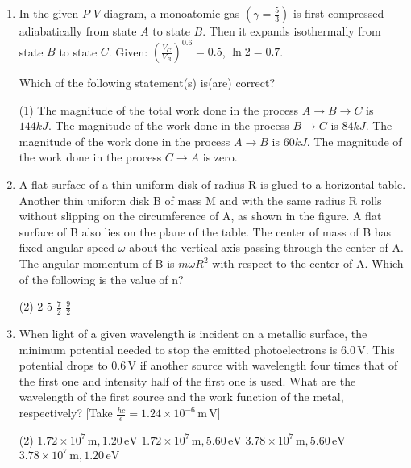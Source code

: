 \documentclass{article}
\begin{document}
\begin{enumerate}
    \item In the given \(P\)-\(V\) diagram, a monoatomic gas \( \left( \gamma = \frac{5}{3} \right) \) is first compressed adiabatically from state \(A\) to state \(B\). Then it expands isothermally from state \(B\) to state \(C\). Given: \( \left(\frac{V_C}{V_B}\right)^{0.6} = 0.5 \), \( \ln 2 = 0.7 \). 
    \begin{center}
        \end{center}Which of the following statement(s) is(are) correct?
        \begin{tasks}(1)
            \task The magnitude of the total work done in the process \( A \rightarrow B \rightarrow C \) is \( 144 kJ \).
            \task The magnitude of the work done in the process \( B \rightarrow C \) is \( 84 kJ \).
            \task The magnitude of the work done in the process \( A \rightarrow B \) is \( 60 kJ \).
            \task The magnitude of the work done in the process \( C \rightarrow A \) is zero.
        \end{tasks}

    \item A flat surface of a thin uniform disk of radius R is glued to a horizontal table. Another thin uniform disk B of mass M and with the same radius R rolls without slipping on the circumference of A, as shown in the figure. A flat surface of B also lies on the plane of the table. The center of mass of B has fixed angular speed \(\omega\) about the vertical axis passing through the center of A. The angular momentum of B is \(m\omega R^2\) with respect to the center of A. Which of the following is the value of n?
        \begin{center}
        \end{center}
        \begin{tasks}(2)
        	\task \(2\)
        	\task \(5\)
        	\task \(\frac{7}{2}\)
        	\task \(\frac{9}{2}\)
        \end{tasks}
    \item When light of a given wavelength is incident on a metallic surface, the minimum potential needed to stop the emitted photoelectrons is \(6.0 \, \text{V}\). This potential drops to \(0.6 \, \text{V}\) if another source with wavelength four times that of the first one and intensity half of the first one is used. What are the wavelength of the first source and the work function of the metal, respectively? [Take \(\frac{hc}{e} = 1.24 \times 10^{-6} \, \text{m} \, \text{V}\)]
        \begin{tasks}(2)
        	\task \(1.72 \times 10^7 \, \text{m}, 1.20 \, \text{eV}\)
        	\task \(1.72 \times 10^7 \, \text{m}, 5.60 \, \text{eV}\)
        	\task \(3.78 \times 10^7 \, \text{m}, 5.60 \, \text{eV}\)
        	\task \(3.78 \times 10^7 \, \text{m}, 1.20 \, \text{eV}\)
        \end{tasks}


\end{enumerate}
\end{document}
